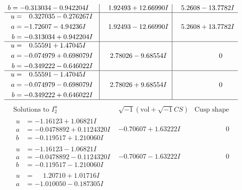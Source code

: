 \documentclass[1p]{elsarticle_modified}
\theoremstyle{definition}
\newcommand{\I}{\sqrt{-1}}
\begin{document}
$$\begin{array}{c|c|c}
\begin{aligned}
b &= -0.313034 - 0.942204 I\end{aligned}
 & \phantom{-}1.92493 + 12.66990 I & \phantom{-}5.2608 - 13.7782 I \\ \hline\begin{aligned}
u &= \phantom{-}0.327035 - 0.276267 I \\
a &= -1.72607 - 4.94236 I \\
b &= -0.313034 + 0.942204 I\end{aligned}
 & \phantom{-}1.92493 - 12.66990 I & \phantom{-}5.2608 + 13.7782 I \\ \hline\begin{aligned}
u &= \phantom{-}0.55591 + 1.47045 I \\
a &= -0.074979 + 0.698079 I \\
b &= -0.349222 - 0.646022 I\end{aligned}
 & \phantom{-}2.78026 - 9.68554 I & \phantom{-0.000000 } 0 \\ \hline\begin{aligned}
u &= \phantom{-}0.55591 - 1.47045 I \\
a &= -0.074979 - 0.698079 I \\
b &= -0.349222 + 0.646022 I\end{aligned}
 & \phantom{-}2.78026 + 9.68554 I & \phantom{-0.000000 } 0\\
 \hline 
 \end{array}$$\newpage$$\begin{array}{c|c|c}  
\text{Solutions to }I^u_{2}& \I (\text{vol} + \sqrt{-1}CS) & \text{Cusp shape}\\
 \hline 
\begin{aligned}
u &= -1.16123 + 1.06821 I \\
a &= -0.0478892 + 0.1124320 I \\
b &= -0.119517 + 1.210060 I\end{aligned}
 & -0.70607 + 1.63222 I & \phantom{-0.000000 } 0 \\ \hline\begin{aligned}
u &= -1.16123 - 1.06821 I \\
a &= -0.0478892 - 0.1124320 I \\
b &= -0.119517 - 1.210060 I\end{aligned}
 & -0.70607 - 1.63222 I & \phantom{-0.000000 } 0 \\ \hline\begin{aligned}
u &= \phantom{-}1.20710 + 1.01716 I \\
a &= -1.010050 - 0.187305 I \\

\end{aligned}
\end{array}$$
\end{document}
